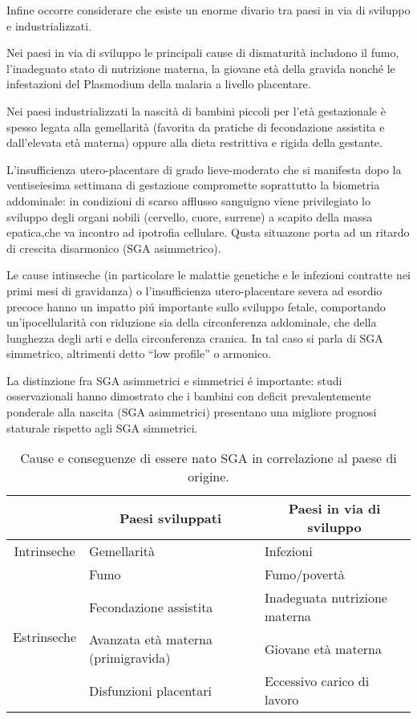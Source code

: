 Infine occorre considerare che esiste un enorme divario tra paesi in via di sviluppo e industrializzati.


Nei paesi in via di sviluppo le principali cause di dismaturità includono il fumo, l'inadeguato stato di 
nutrizione materna, la giovane età della gravida nonché le infestazioni del Plasmodium della malaria a 
livello placentare.


Nei paesi industrializzati la nascità di bambini piccoli per l'età gestazionale
è spesso legata alla gemellarità (favorita da pratiche di fecondazione assistita
e dall'elevata età materna) oppure alla dieta restrittiva e rigida della gestante.


L'insufficienza utero-placentare di grado lieve-moderato che si manifesta dopo la 
ventiseiesima settimana di gestazione compromette soprattutto la biometria addominale: 
in condizioni di scarso afflusso sanguigno viene privilegiato lo sviluppo degli 
organi nobili (cervello, cuore, surrene) a scapito della massa epatica,che va incontro ad ipotrofia cellulare. 
Qusta situazone porta ad un ritardo di crescita disarmonico (SGA asimmetrico).


Le cause intinseche (in particolare le malattie genetiche e le infezioni contratte 
nei primi mesi di gravidanza) o l'insufficienza utero-placentare severa ad esordio 
precoce hanno un impatto pi\'u importante sullo sviluppo fetale, comportando un'ipocellularità con 
riduzione sia della circonferenza addominale, che della lunghezza degli arti e 
della circonferenza cranica. In tal caso si parla di SGA simmetrico, altrimenti detto "`low profile"' o armonico.


La distinzione fra SGA asimmetrici e simmetrici \'e importante: studi osservazionali 
hanno dimostrato che i bambini con deficit prevalentemente ponderale alla nascita 
(SGA asimmetrici) presentano una migliore prognosi staturale rispetto agli SGA simmetrici.\cite{sga-10}

\begin{table}[h]\centering
\begin{tabular}{cll}
\toprule
			& \multicolumn{1}{c}{Paesi sviluppati}			& \multicolumn{1}{c}{Paesi in via di sviluppo} \\
\midrule
Intrinseche & Gemellarit\`a 			& Infezioni			\\\midrule
\multirow{4}{*}{Estrinseche} & Fumo						& Fumo/povertà		\\\cmidrule(l){2-3}
			& Fecondazione assistita	& Inadeguata nutrizione materna	\\\cmidrule(l){2-3}
			& Avanzata età materna (primigravida) &	Giovane età materna \\\cmidrule(l){2-3}
			& Disfunzioni placentari	& Eccessivo carico di lavoro	\\\bottomrule
\end{tabular}
\label{tab-cause}
\caption{Cause e conseguenze di essere nato SGA in correlazione al paese di origine.}
\end{table}

